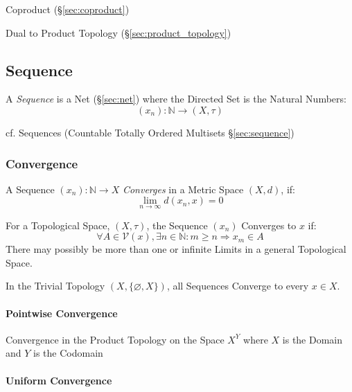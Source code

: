 Coproduct (\S\ref{sec:coproduct})

Dual to Product Topology (\S\ref{sec:product_topology})



\subsection{Sequence}\label{sec:sequence_topology}

A \emph{Sequence} is a Net (\S\ref{sec:net}) where the Directed Set is
the Natural Numbers:
\[
  (x_n) : \mathbb{N} \rightarrow (X,\tau)
\]

cf. Sequences (Countable Totally Ordered Multisets \S\ref{sec:sequence})



\subsubsection{Convergence}\label{sec:convergence}

A Sequence $(x_n) : \mathbb{N} \rightarrow X$ \emph{Converges} in a Metric
Space $(X,d)$, if:
\[
  \lim_{n \rightarrow \infty} d (x_n, x) = 0
\]

For a Topological Space, $(X,\tau)$, the Sequence $(x_n)$ Converges to
$x$ if:
\[
  \forall A \in \mathcal{V}(x), \exists n \in \mathbb{N}
  : m \geq n \Rightarrow x_m \in A
\]
There may possibly be more than one or infinite Limits in a general
Topological Space.

In the Trivial Topology $(X, \{\varnothing, X\})$, all Sequences
Converge to every $x \in X$.



\paragraph{Pointwise Convergence}\label{sec:pointwise_convergence}\hfill

Convergence in the Product Topology on the Space $X^Y$ where $X$ is the Domain
and $Y$ is the Codomain



\paragraph{Uniform Convergence}\label{sec:uniform_convergence}\hfill

